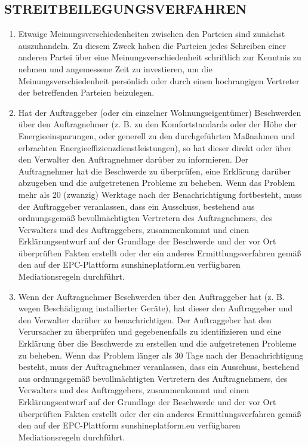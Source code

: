 \begin{multicols}{2}
\subsection{STREITBEILEGUNGSVERFAHREN}
\begin{enumerate}
   \item Etwaige Meinungsverschiedenheiten zwischen den Parteien sind zunächst auszuhandeln. Zu diesem Zweck haben die Parteien jedes Schreiben einer anderen Partei über eine Meinungsverschiedenheit schriftlich zur Kenntnis zu nehmen und angemessene Zeit zu investieren, um die Meinungsverschiedenheit persönlich oder durch einen hochrangigen Vertreter der betreffenden Parteien beizulegen.
   \item Hat der Auftraggeber (oder ein einzelner Wohnungseigentümer) Beschwerden über den Auftragnehmer (z. B. zu den Komfortstandards oder der Höhe der Energieeinsparungen, oder generell zu den durchgeführten Maßnahmen und erbrachten Energieeffizienzdienstleistungen), so hat dieser direkt oder über den Verwalter den Auftragnehmer darüber zu informieren. Der Auftragnehmer hat die Beschwerde zu überprüfen, eine Erklärung darüber abzugeben und die aufgetretenen Probleme zu beheben. Wenn das Problem mehr als 20 (zwanzig) Werktage nach der Benachrichtigung fortbesteht, muss der Auftraggeber veranlassen, dass ein Ausschuss, bestehend aus ordnungsgemäß bevollmächtigten Vertretern des Auftragnehmers, des Verwalters und des Auftraggebers, zusammenkommt und einen Erklärungsentwurf auf der Grundlage der Beschwerde und der vor Ort überprüften Fakten erstellt oder der ein anderes Ermittlungsverfahren gemäß den auf der EPC-Plattform sunshineplatform.eu verfügbaren Mediationsregeln durchführt.
   \item Wenn der Auftragnehmer Beschwerden über den Auftraggeber hat (z. B. wegen Beschädigung installierter Geräte), hat dieser den Auftraggeber und den Verwalter darüber zu benachrichtigen. Der Auftraggeber hat den Verursacher zu überprüfen und gegebenenfalls zu identifizieren und eine Erklärung über die Beschwerde zu erstellen und die aufgetretenen Probleme zu beheben. Wenn das Problem länger als 30 Tage nach der Benachrichtigung besteht, muss der Auftragnehmer veranlassen, dass ein Ausschuss, bestehend aus ordnungsgemäß bevollmächtigten Vertretern des Auftragnehmers, des  Verwalters und des Auftraggebers, zusammenkommt und einen Erklärungsentwurf auf der Grundlage der Beschwerde und der vor Ort überprüften Fakten erstellt oder der ein anderes Ermittlungsverfahren gemäß den auf der EPC-Plattform sunshineplatform.eu verfügbaren Mediationsregeln durchführt.

\end{enumerate}
\end{multicols}
